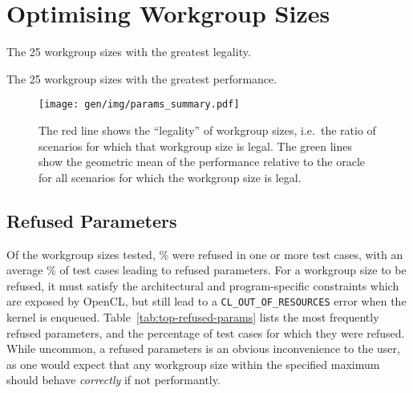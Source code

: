 

\section{Optimising Workgroup Sizes}

%


\begin{table}
  \parbox{.45\linewidth}{
    \centering
    \scriptsize
    
    \caption{The 25 workgroup sizes with the greatest legality.}
  }
  \hfill
  \parbox{.45\linewidth}{
    \centering
    \scriptsize
    
    \caption{The 25 workgroup sizes with the greatest performance.}
  }
\end{table}


\begin{figure}
\centering
\texttt{[image: gen/img/params\_summary.pdf]}
\caption{%
  The red line shows the ``legality'' of workgroup sizes, i.e.\ the
  ratio of scenarios for which that workgroup size is legal.  The
  green lines show the geometric mean of the performance relative to
  the oracle for all scenarios for which the workgroup size is legal.%
}
\label{fig:performance-legality}
\end{figure}

\subsection{Refused Parameters}

Of the  workgroup sizes tested,
\% were refused in one or more test
cases, with an average \% of test
cases leading to refused parameters. For a workgroup size to be
refused, it must satisfy the architectural and program-specific
constraints which are exposed by OpenCL, but still lead to a
\texttt{CL\_OUT\_OF\_RESOURCES} error when the kernel is
enqueued. Table~\ref{tab:top-refused-params} lists the most frequently
refused parameters, and the percentage of test cases for which they
were refused. While uncommon, a refused parameters is an obvious
inconvenience to the user, as one would expect that any workgroup size
within the specified maximum should behave \emph{correctly} if not
performantly.

